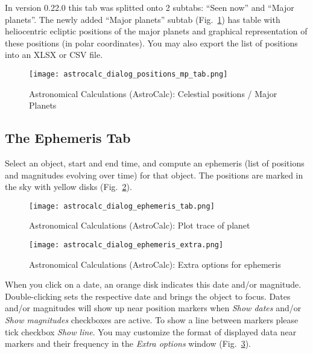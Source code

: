 In version 0.22.0 this tab was splitted onto 2 subtabs: ``Seen now'' and ``Major planets''. The newly added ``Major planets'' subtab (Fig.~\ref{fig:gui:AstroCalc:Positions:MajorPlanets}) has table with heliocentric ecliptic positions of the major planets and graphical representation of these positions (in polar coordinates). You may also export the list of positions into an XLSX or CSV file.

\begin{figure}[htbp]
	\centering\texttt{[image: astrocalc\_dialog\_positions\_mp\_tab.png]}
	\caption{Astronomical Calculations (AstroCalc): Celestial positions / Major Planets}
	\label{fig:gui:AstroCalc:Positions:MajorPlanets}
\end{figure}

\subsection{The Ephemeris Tab}
\label{sec:gui:AstroCalc:Ephemeris}

Select an object, start and end time, and compute an ephemeris (list of positions and magnitudes evolving over time) for that object. 
The positions are marked in the sky with yellow disks (Fig.~\ref{fig:gui:AstroCalc:Ephemeris}). 

\begin{figure}[tbp]
	\centering\texttt{[image: astrocalc\_dialog\_ephemeris\_tab.png]}
	\caption{Astronomical Calculations (AstroCalc): Plot trace of planet}
	\label{fig:gui:AstroCalc:Ephemeris}
\end{figure}

\begin{figure}[tbp]
	\centering\texttt{[image: astrocalc\_dialog\_ephemeris\_extra.png]}
	\caption{Astronomical Calculations (AstroCalc): Extra options for ephemeris}
	\label{fig:gui:AstroCalc:Ephemeris:Extra}
\end{figure}

When you click on a date, an orange disk indicates this date and/or magnitude. 
Double-clicking sets the respective date and brings the object to focus. 
Dates and/or magnitudes will show up near position markers when \emph{Show dates} 
and/or \emph{Show magnitudes} checkboxes are active.  
To show a line between markers please tick checkbox \emph{Show line}. 
You may customize the format of displayed data near markers and their frequency in the \emph{Extra options} window (Fig.~\ref{fig:gui:AstroCalc:Ephemeris:Extra}).

